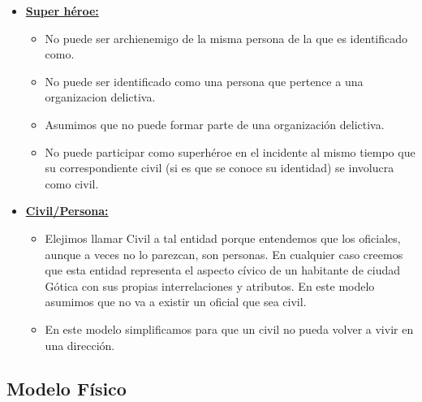 \begin{itemize}
\item\uline{\textbf{Super héroe:}}
\begin{itemize}
\item No puede ser archienemigo de la misma persona de la que es identificado como.
\item No puede ser identificado como una persona que pertence a una organizacion delictiva.
\item Asumimos que no puede formar parte de una organización delictiva.
\item No puede participar como superhéroe en el incidente al mismo tiempo que su correspondiente 
civil (si es que se conoce su identidad) se involucra como civil.
\end{itemize}
\item\uline{\textbf{Civil/Persona:}}
\begin{itemize}
\item  Elejimos llamar Civil a tal entidad porque entendemos que los oficiales, aunque a veces no lo parezcan, son personas. En cualquier caso creemos que esta entidad representa el aspecto cívico de un habitante de ciudad Gótica con sus propias interrelaciones y atributos.
En este modelo asumimos que no va a existir un oficial que sea civil.
\item En este modelo simplificamos para que un civil no pueda volver a vivir en una dirección.

\end{itemize}
\end{itemize}

\subsection{Modelo Físico}